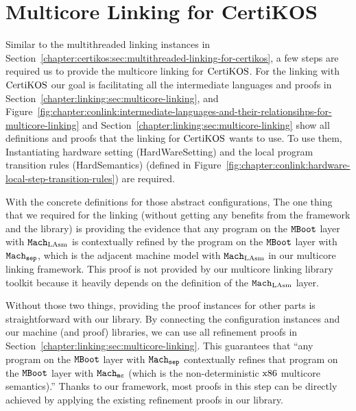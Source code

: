 \section{Multicore Linking for CertiKOS}
\label{chapter:certikos:sec:multicore-linking-for-certikos}

Similar to the multithreaded linking instances in Section~\ref{chapter:certikos:sec:multithreaded-linking-for-certikos}, a few steps are required us to provide the multicore linking for $\mathrm{CertiKOS}$.
For the linking with $\mathrm{CertiKOS}$
our goal is facilitating all the intermediate languages
and proofs in Section~\ref{chapter:linking:sec:multicore-linking},
and
Figure~\ref{fig:chapter:conlink:intermediate-languages-and-their-relationsihps-for-multicore-linking} and 
Section~\ref{chapter:linking:sec:multicore-linking} show all definitions and 
proofs that the linking for $\mathrm{CertiKOS}$ wants to use. 
To use them, 
Instantiating hardware setting (HardWareSetting) and the local program transition rules (HardSemantics) 
(defined in Figure~\ref{fig:chapter:conlink:hardware-local-step-transition-rules})
are required. 

With the concrete definitions for those abstract configurations, 
The one thing that we required for the linking (without getting any benefits from the framework and the library)
is providing the evidence that any program on the ${\mathrm{\texttt{MBoot}}}$ layer with ${\mathrm{\texttt{Mach}}}_{\mathrm{LAsm}}$ is contextually refined by the program on the ${\mathrm{\texttt{MBoot}}}$ layer with ${{{\mathrm{\texttt{Mach}}}}_{{\mathrm{\texttt{sep}}}}}$, which is the adjacent machine model with ${\mathrm{\texttt{Mach}}}_{\mathrm{LAsm}}$ in our multicore linking framework. This proof is not provided by our multicore linking library toolkit because it heavily depends on the definition of the ${\mathrm{\texttt{Mach}}}_{\mathrm{LAsm}}$ layer.

Without those two things, 
providing the proof instances for other parts is straightforward with our library. 
By connecting the configuration instances and our machine (and proof) libraries, 
we can use all refinement proofs in Section~\ref{chapter:linking:sec:multicore-linking}. 
This guarantees that ``any program on the ${\mathrm{\texttt{MBoot}}}$ layer with ${{{\mathrm{\texttt{Mach}}}}_{{\mathrm{\texttt{sep}}}}}$ contextually refines that program on the ${\mathrm{\texttt{MBoot}}}$ layer with ${{{{\mathrm{\texttt{Mach}}}}_{\mathrm{\texttt{mc}}}}}$ (which is the non-deterministic $\mathrm{x86}$ multicore semantics).''
Thanks to our framework, most proofs in this step can be directly achieved by applying the existing refinement proofs in our library.
%
